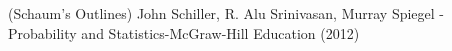 \documentclass[12pt,twoside]{report}
\theoremstyle{remark}
\begin{document}
\newpage
{}
\begin{thebibliography}{9}
        (Schaum’s Outlines) John Schiller, R. Alu Srinivasan, Murray Spiegel - Probability and Statistics-McGraw-Hill Education (2012)
        \lipsum[2][1-3]
        \lipsum[3][1-3]
        \lipsum[4][1-3]
        \lipsum[5][1-3]
        \lipsum[6][1-3]
\end{thebibliography}
\end{document}
